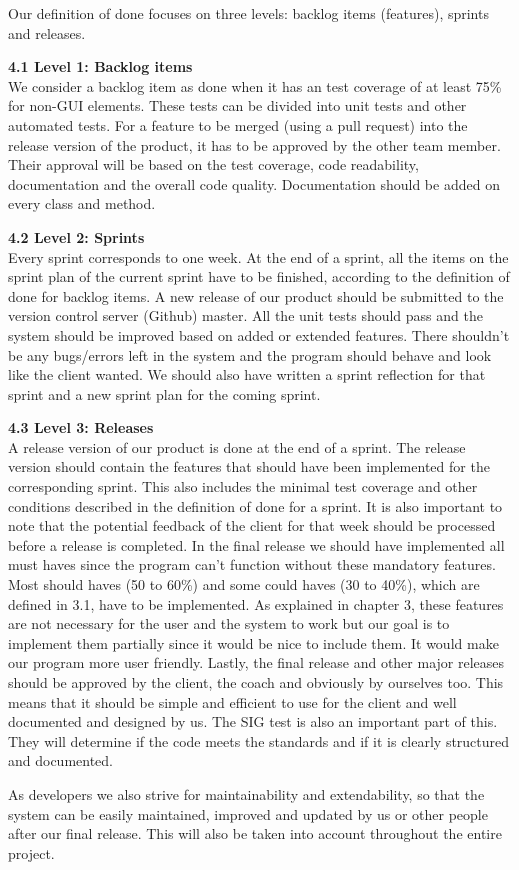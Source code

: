 ﻿\documentclass[a4paper,english,fleqn]{exam}
\begin{document}
Our definition of done focuses on three levels: backlog items (features), sprints and releases.

\textbf{4.1 Level 1: Backlog items} \\
We consider a backlog item as done when it has an test coverage of at least 75\% for non-GUI elements. These tests can be divided into unit tests and other automated tests. For a feature to be merged (using a pull request) into the release version of the product, it has to be approved by the other team member. Their approval will be based on the test coverage, code readability, documentation and the overall code quality. Documentation should be added on every class and method. 

\textbf{4.2 Level 2: Sprints} \\
Every sprint corresponds to one week. At the end of a sprint, all the items on the sprint plan of the current sprint have to be finished, according to the definition of done for backlog items. A new release of our product should be submitted to the version control server (Github) master. All the unit tests should pass and the system should be improved based on added or extended features. There shouldn't be any bugs/errors left in the system and the program should behave and look like the client wanted. We should also have written a sprint reflection for that sprint and a new sprint plan for the coming sprint. 

\textbf{4.3 Level 3: Releases}\\
A release version of our product is done at the end of a sprint. The release version should contain the features that should have been implemented for the corresponding sprint. This also includes the minimal test coverage and other conditions described in the definition of done for a sprint. It is also important to note that the potential feedback of the client for that week should be processed before a release is completed.
In the final release we should have implemented all must haves since the program can't function without these mandatory features. Most should haves (50 to 60\%) and some could haves (30 to 40\%), which are defined in 3.1, have to be implemented. As explained in chapter 3, these features are not necessary for the user and the system to work but our goal is to implement them partially since it would be nice to include them. It would make our program more user friendly. 
Lastly, the final release and other major releases should be approved by the client, the coach and obviously by ourselves too. This means that it should be simple and efficient to use for the client and well documented and designed by us. The SIG test is also an important part of this. They will determine if the code meets the standards and if it is clearly structured and documented. 

As developers we also strive for maintainability and extendability, so that the system can be easily maintained, improved and updated by us or other people after our final release. This will also be taken into account throughout the entire project.
\end{document}
